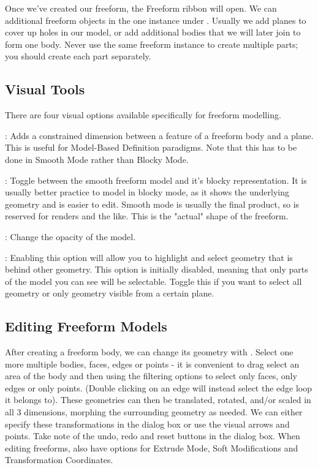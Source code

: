 Once we've created our freeform, the Freeform ribbon will open. We can additional freeform objects in the one instance under . Usually we add planes to cover up holes in our model, or add additional bodies that we will later join to form one body. Never use the same freeform instance to create multiple parts; you should create each part separately.

\subsection{Visual Tools}

There are four visual options available specifically for freeform modelling.

: \newline
Adds a constrained dimension between a feature of a freeform body and a plane. This is useful for Model-Based Definition paradigms. Note that this has to be done in Smooth Mode rather than Blocky Mode.

: \newline
Toggle between the smooth freeform model and it's blocky representation. It is usually better practice to model in blocky mode, as it shows the underlying geometry and is easier to edit. Smooth mode is usually the final product, so is reserved for renders and the like. This is the "actual" shape of the freeform.

: \newline
Change the opacity of the model. 

: \newline
Enabling this option will allow you to highlight and select geometry that is behind other geometry. This option is initially disabled, meaning that only parts of the model you can see will be selectable. Toggle this if you want to select all geometry or only geometry visible from a certain plane.

\subsection{Editing Freeform Models}

After creating a freeform body, we can change its geometry with . Select one more multiple bodies, faces, edges or points - it is convenient to drag select an area of the body and then using the filtering options to select only faces, only edges or only points. (Double clicking on an edge will instead select the edge loop it belongs to). These geometries can then be translated, rotated, and/or scaled in all 3 dimensions, morphing the surrounding geometry as needed. We can either specify these transformations in the dialog box or use the visual arrows and points. Take note of the undo, redo and reset buttons in the dialog box. When editing freeforms, also have options for Extrude Mode, Soft Modifications and Transformation Coordinates.

